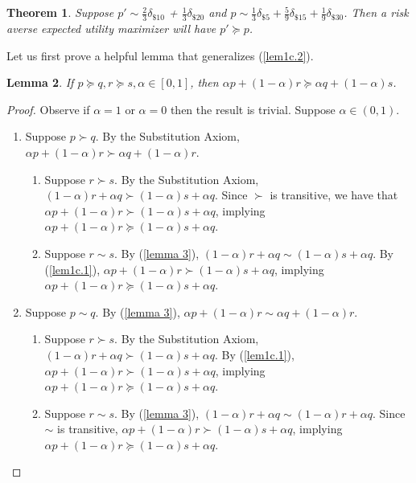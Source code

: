 \documentclass[12pt]{article}
\newtheorem{thm}{Theorem}[section]
\newtheorem{lem}[thm]{Lemma}
\theoremstyle{definition}
\theoremstyle{remark}
\begin{document}
\section{}
\begin{thm}
  Suppose $p' \sim \frac{2}{3}\delta_{\$ 10}$ + $\frac{1}{3}\delta_{\$ 20}$ and $p \sim \frac{1}{3}\delta_{\$ 5} + \frac{5}{9}\delta_{\$ 15} + \frac{1}{9}\delta_{\$ 30}$.
  Then a risk averse expected utility maximizer will have $p' \succeq p$.
\end{thm}
Let us first prove a helpful lemma that generalizes (\ref{lem1c.2}).
\begin{lem}\label{lem 2.1}
  If $p \succeq q, r \succeq s, \alpha \in [0,1]$, then $\alpha p + (1 - \alpha)r \succeq \alpha q + (1 - \alpha)s$.
\end{lem}
\begin{proof}
  Observe if $\alpha = 1$ or $\alpha = 0$ then the result is trivial. Suppose $\alpha \in (0,1)$.
  \begin{enumerate}
    \item Suppose $p \succ q$. By the Substitution Axiom, $\alpha p + (1 - \alpha)r \succ \alpha q + (1 - \alpha)r$.
    \begin{enumerate}
      \item Suppose $r \succ s$. By the Substitution Axiom, $(1 - \alpha)r + \alpha q \succ (1 - \alpha)s + \alpha q$. Since $\succ$ is transitive, we have that $\alpha p + (1 - \alpha)r \succ (1 - \alpha)s + \alpha q$, implying $\alpha p + (1 - \alpha)r \succeq (1 - \alpha)s + \alpha q$.
      \item Suppose $r \sim s$. By (\ref{lemma 3}), $(1 - \alpha)r + \alpha q \sim (1 - \alpha)s + \alpha q$. By (\ref{lem1c.1}), $\alpha p + (1 - \alpha)r \succ (1 - \alpha)s + \alpha q$, implying $\alpha p + (1 - \alpha)r \succeq (1 - \alpha)s + \alpha q$.
    \end{enumerate}
    \item Suppose $p \sim q$. By (\ref{lemma 3}), $\alpha p + (1 - \alpha)r \sim \alpha q + (1 - \alpha)r$.
    \begin{enumerate}
      \item Suppose $r \succ s$. By the Substitution Axiom, $(1 - \alpha)r + \alpha q \succ (1 - \alpha)s + \alpha q$. By (\ref{lem1c.1}), $\alpha p + (1 - \alpha)r \succ (1 - \alpha)s + \alpha q$, implying $\alpha p + (1 - \alpha)r \succeq (1 - \alpha)s + \alpha q$.
      \item Suppose $r \sim s$. By (\ref{lemma 3}), $(1 - \alpha)r + \alpha q \sim (1 - \alpha)r + \alpha q$. Since $\sim$ is transitive, $\alpha p + (1 - \alpha)r \succ (1 - \alpha)s + \alpha q$, implying $\alpha p + (1 - \alpha)r \succeq (1 - \alpha)s + \alpha q$.
    \end{enumerate}
  \end{enumerate}
\end{proof}
\end{document}
